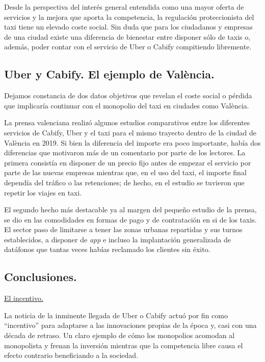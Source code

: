 \documentclass[
]{article}
\begin{document}
Desde la perspectiva del interés general entendida como una mayor oferta
de servicios y la mejora que aporta la competencia, la regulación
proteccionista del taxi tiene un elevado coste social. Sin duda que para
los ciudadanos y empresas de una ciudad existe una diferencia de
bienestar entre disponer sólo de taxis o, además, poder contar con el
servicio de Uber o Cabify compitiendo libremente.

\hypertarget{uber-y-cabify.-el-ejemplo-de-valuxe8ncia.}{%
\subsection{Uber y Cabify. El ejemplo de
València.}\label{uber-y-cabify.-el-ejemplo-de-valuxe8ncia.}}

Dejamos constancia de dos datos objetivos que revelan el coste social o
pérdida que implicaría continuar con el monopolio del taxi en ciudades
como València.

La prensa valenciana realizó algunos estudios comparativos entre los
diferentes servicios de Cabify, Uber y el taxi para el mismo trayecto
dentro de la ciudad de València en 2019. Si bien la diferencia del
importe era poco importante, había dos diferencias que motivaron más de
un comentario por parte de los lectores. La primera consistía en
disponer de un precio fijo antes de empezar el servicio por parte de las
nuevas empresas mientras que, en el uso del taxi, el importe final
dependía del tráfico o las retenciones; de hecho, en el estudio se
tuvieron que repetir los viajes en taxi.

El segundo hecho más destacable ya al margen del pequeño estudio de la
prensa, se dio en las comodidades en formas de pago y de contratación en
si de los taxis. El sector paso de limitarse a tener las zonas urbanas
repartidas y sus turnos establecidos, a disponer de \emph{app} e incluso
la implantación generalizada de datáfonos que tantas veces habías
reclamado los clientes sin éxito.

\hypertarget{conclusiones.}{%
\subsection*{Conclusiones.}\label{conclusiones.}}

\ul{El incentivo.}

La noticia de la inminente llegada de Uber o Cabify actuó por fin como
``incentivo'' para adaptarse a las innovaciones propias de la época y,
casi con una década de retraso. Un claro ejemplo de cómo los monopolios
acomodan al monopolista y frenan la inversión mientras que la
competencia libre causa el efecto contrario beneficiando a la sociedad.
\end{document}
